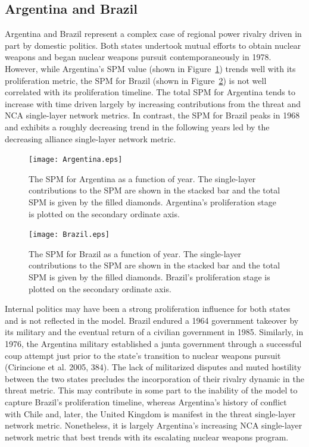 \documentclass{article} %
\begin{document}
{\subsection*{Argentina and Brazil}
\label{Arg-and-Braz}

Argentina and Brazil represent a complex case of regional power rivalry driven in part by domestic politics. Both states undertook mutual efforts to obtain nuclear weapons and began nuclear weapons pursuit contemporaneously in 1978. However, while Argentina's SPM value (shown in Figure~\ref{fig:arg}) trends well with its proliferation metric, the SPM for Brazil (shown in Figure~\ref{fig:braz}) is not well correlated with its proliferation timeline. The total SPM for Argentina tends to increase with time driven largely by increasing contributions from the threat and NCA single-layer network metrics. In contrast, the SPM for Brazil peaks in 1968 and exhibits a roughly decreasing trend in the following years led by the decreasing alliance single-layer network metric. 

\begin{figure}
  \centering
  \texttt{[image: Argentina.eps]}
  \caption{The SPM for Argentina as a function of year. The single-layer contributions to the SPM are shown in the stacked bar and the total SPM is given by the filled diamonds. Argentina's proliferation stage is plotted on the secondary ordinate axis.}
  \label{fig:arg}
\end{figure}

\begin{figure}
  \centering
  \texttt{[image: Brazil.eps]}
  \caption{The SPM for Brazil as a function of year. The single-layer contributions to the SPM are shown in the stacked bar and the total SPM is given by the filled diamonds. Brazil's proliferation stage is plotted on the secondary ordinate axis.}
  \label{fig:braz}
\end{figure}

Internal politics may have been a strong proliferation influence for both states and is not reflected in the model. Brazil endured a 1964 government takeover by its military and the eventual return of a civilian government in 1985. Similarly, in 1976, the Argentina military established a junta government through a successful coup attempt just prior to the state's transition to nuclear weapons pursuit (Cirincione et al. 2005, 384). The lack of militarized disputes and muted hostility between the two states precludes the incorporation of their rivalry dynamic in the threat metric. This may contribute in some part to the inability of the model to capture Brazil's proliferation timeline, whereas Argentina's history of conflict with Chile and, later, the United Kingdom is manifest in the threat single-layer network metric. Nonetheless, it is largely Argentina's increasing NCA single-layer network metric that best trends with its escalating nuclear weapons program. 

}
\end{document}
